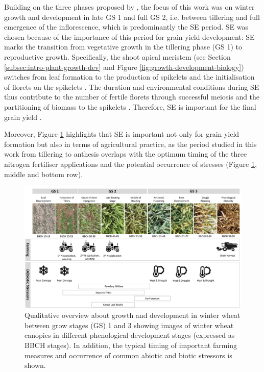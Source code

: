 Building on the three phases proposed by \cite{kirby_analysis_1988}, the focus of this work was on winter growth and development in late \gls{GS} 1 and full \gls{GS} 2, i.e. between tillering and full emergence of the inflorescence, which is predominantly the \gls{SE} period. \gls{SE} was chosen because of the importance of this period for grain yield development: \gls{SE} marks the transition from vegetative growth in the tillering phase (\gls{GS} 1) to reproductive growth. Specifically, the shoot apical meristem (see Section \ref{subsec:intro-plant-growth-dev} and Figure \ref{fig:growth-development-biology}) switches from leaf formation to the production of spikelets and the initialisation of florets on the spikelets \citep{mcmaster_simulating_1992}. The duration and environmental conditions during \gls{SE} thus contribute to the number of fertile florets through successful meiosis \citep{villegas_daylength_2016} and the partitioning of biomass to the spikelets \citep{gonzalez_grain_2003}. Therefore, \gls{SE} is important for the final grain yield \citep{fischer_yield_1975,fischer_wheat_2011}.

Moreover, Figure \ref{fig:ww-growth-qualitative} highlights that \gls{SE} is important not only for grain yield formation but also in terms of agricultural practice, as the period studied in this work from tillering to anthesis overlaps with the optimum timing of the three nitrogen fertiliser applications \citep{lewis_effect_1938} and the potential occurrence of stresses (Figure \ref{fig:ww-growth-qualitative}, middle and bottom row).

\begin{figure}[H]
    \centering
    \includegraphics[width=\textwidth]{01-Introduction/img/wheat_developement.pdf}
    \caption{Qualitative overview about growth and development in winter wheat between grow stages (GS) 1 and 3 showing images of winter wheat canopies in different phenological development stages (expressed as \gls{BBCH} stages). In addition, the typical timing of important farming measures and occurrence of common abiotic and biotic stressors is shown.}
    \label{fig:ww-growth-qualitative}
\end{figure}

